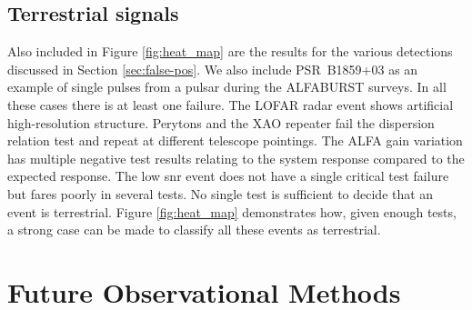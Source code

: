 \documentclass[a4paper,fleqn,usenatbib]{mnras}
\newcommand{\cM}[1]{\textcolor{magenta}{ #1 --M}}
\begin{document}
%

\subsection{Terrestrial signals}

Also included in Figure \ref{fig:heat_map} are the results for the various
detections discussed in Section \ref{sec:false-pos}. We also include
PSR~B1859+03 as an example of single pulses from a pulsar during the ALFABURST
surveys.  In all these cases there is at least one failure.  The LOFAR radar
event shows artificial high-resolution structure.  Perytons and the XAO repeater
fail the dispersion relation test and repeat at different telescope pointings.
The ALFA gain variation has multiple negative test results relating to the
system response compared to the expected response.  The low \gls{snr} event does
not have a single critical test failure but fares poorly in several tests.  No
single test is sufficient to decide that an event is terrestrial. Figure
\ref{fig:heat_map} demonstrates how, given enough tests, a strong case can be
made to classify all these events as terrestrial.

\section{Future Observational Methods}
\label{sec:future_methods}
\end{document}
